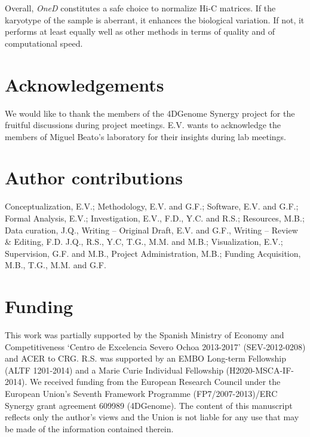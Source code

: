 \documentclass{bioinfo}
\begin{document}
Overall, \textit{OneD} constitutes a safe choice to normalize Hi-C
matrices. If the karyotype of the sample is aberrant, it enhances the
biological variation.  If not, it performs at least equally well as other
methods in terms of quality and of computational speed.


\section*{Acknowledgements}

We would like to thank the members of the 4DGenome Synergy project for the
fruitful discussions during project meetings. E.V. wants to acknowledge
the members of Miguel Beato's laboratory for their insights during lab
meetings.

\section*{Author contributions}

Conceptualization, E.V.; Methodology, E.V. and G.F.; Software, E.V. and
G.F.; Formal Analysis, E.V.; Investigation, E.V., F.D., Y.C. and R.S.;
Resources, M.B.; Data curation, J.Q., Writing – Original Draft, E.V. and
G.F., Writing – Review \& Editing, F.D. J.Q., R.S., Y.C, T.G., M.M. and
M.B.; Visualization, E.V.; Supervision, G.F. and M.B., Project
Administration, M.B.; Funding Acquisition, M.B., T.G., M.M. and G.F.

\section*{Funding}

This work was partially supported by the Spanish Ministry of Economy and
Competitiveness `Centro de Excelencia Severo Ochoa 2013-2017'
(SEV-2012-0208) and ACER to CRG. R.S. was supported by an EMBO Long-term
Fellowship (ALTF 1201-2014) and a Marie Curie Individual Fellowship
(H2020-MSCA-IF-2014). We received funding from the European Research
Council under the European Union's Seventh Framework Programme
(FP7/2007-2013)/ERC Synergy grant agreement 609989 (4DGenome). The content
of this manuscript reflects only the author's views and the Union is not
liable for any use that may be made of the information contained therein.

\vspace*{-12pt}



\end{document}
